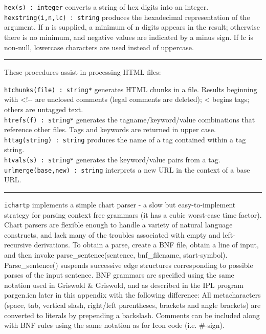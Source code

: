 \texttt{hex(s) : integer} converts a string of hex digits into an
integer.\\
\texttt{hexstring(i,n,lc) : string} produces the
hexadecimal representation of the argument. If n is
supplied, a minimum of n digits appears in the result; otherwise there
is no minimum, and negative values are indicated by a minus sign. If lc
is non-null, lowercase characters are used instead of uppercase.

\vspace{0.25cm}\hrule{}

These procedures assist in processing HTML files:

\texttt{htchunks(file) : string*} generates HTML chunks in a
file. Results beginning with {\textless}!-{}- are unclosed comments
(legal comments are deleted); {\textless} begins tags; others are
untagged text.\\
\texttt{htrefs(f) : string*} generates the tagname/keyword/value
combinations that reference other files. Tags and
keywords are returned in upper case.\\
\texttt{httag(string) : string} produces the name of a tag contained
within a tag string.\\
\texttt{htvals(s) : string*} generates the keyword/value pairs from a
tag.\\
\texttt{urlmerge(base,new) : string} interprets a new URL in the context
of a base URL.

\vspace{0.25cm}\hrule{}

\texttt{ichartp} implements a simple chart
parser - a slow but easy-to-implement strategy for parsing
context free grammars (it has a cubic worst-case time factor). Chart
parsers are flexible enough to handle a variety of natural language
constructs, and lack many of the troubles associated with empty and
left-recursive derivations. To obtain a parse, create a BNF
file, obtain a line of input, and then invoke parse\_sentence(sentence,
bnf\_filename, start-symbol). Parse\_sentence() suspends successive
edge structures corresponding to possible parses of the input sentence.
BNF grammars are specified using the same notation used in Griswold \&
Griswold, and as described in the IPL program
{\textquotedbl}pargen.icn{\textquotedbl} later in this appendix with
the following difference: All metacharacters (space, tab, vertical
slash, right/left parentheses, brackets and angle brackets) are
converted to literals by prepending a backslash. Comments can be
included along with BNF rules using the same notation as for Icon code
(i.e. \#-sign).

